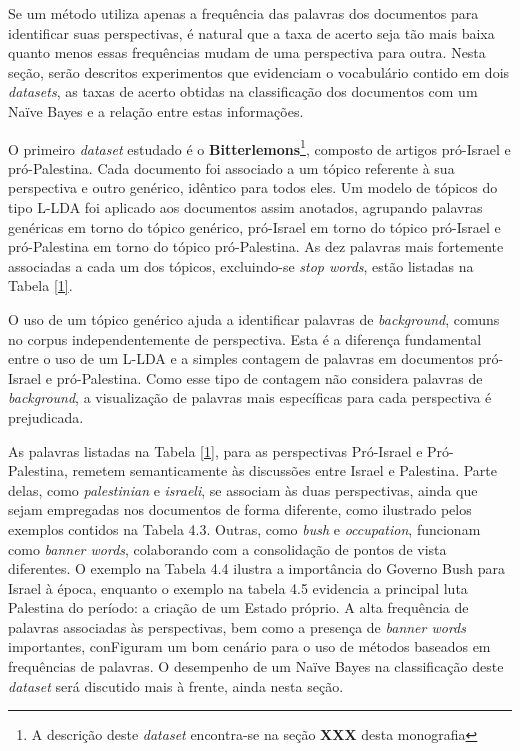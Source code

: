 Se um método utiliza apenas a frequência das palavras dos documentos para identificar suas perspectivas, é natural que a taxa de acerto seja tão mais baixa quanto menos essas frequências mudam de uma perspectiva para outra. Nesta seção, serão descritos experimentos que evidenciam o vocabulário contido em dois \emph{datasets}, as taxas de acerto obtidas na classificação dos documentos com um Naïve Bayes e a relação entre estas informações.

O primeiro \emph{dataset} estudado é o \textbf{Bitterlemons}\footnote{A descrição deste \emph{dataset} encontra-se na seção \textbf{XXX} desta monografia}, composto de artigos pró-Israel e pró-Palestina. Cada documento foi associado a um tópico referente à sua perspectiva e outro genérico, idêntico para todos eles. Um modelo de tópicos do tipo L-LDA foi aplicado aos documentos assim anotados, agrupando palavras genéricas em torno do tópico genérico, pró-Israel em torno do tópico pró-Israel e pró-Palestina em torno do tópico pró-Palestina. As dez palavras mais fortemente associadas a cada um dos tópicos, excluindo-se \emph{stop words}, estão listadas na Tabela \ref{1}.

O uso de um tópico genérico ajuda a identificar palavras de \emph{background}, comuns no corpus independentemente de perspectiva. Esta é a diferença fundamental entre o uso de um L-LDA e a simples contagem de palavras em documentos pró-Israel e pró-Palestina. Como esse tipo de contagem não considera palavras de \emph{background}, a visualização de palavras mais específicas para cada perspectiva é prejudicada.

As palavras listadas na Tabela \ref{1}, para as perspectivas Pró-Israel e Pró-Palestina, remetem semanticamente às discussões entre Israel e Palestina. Parte delas, como \emph{palestinian} e \emph{israeli}, se associam às duas perspectivas, ainda que sejam empregadas nos documentos de forma diferente, como ilustrado pelos exemplos contidos na Tabela 4.3. Outras, como \emph{bush} e \emph{occupation}, funcionam como \emph{banner words}, colaborando com a consolidação de pontos de vista diferentes. O exemplo na Tabela 4.4 ilustra a importância do Governo Bush para Israel à época, enquanto o exemplo na tabela 4.5 evidencia a principal luta Palestina do período: a criação de um Estado próprio. A alta frequência de palavras associadas às perspectivas, bem como a presença de \emph{banner words} importantes, conFiguram um bom cenário para o uso de métodos baseados em frequências de palavras. O desempenho de um Naïve Bayes na classificação deste \emph{dataset} será discutido mais à frente, ainda nesta seção.

